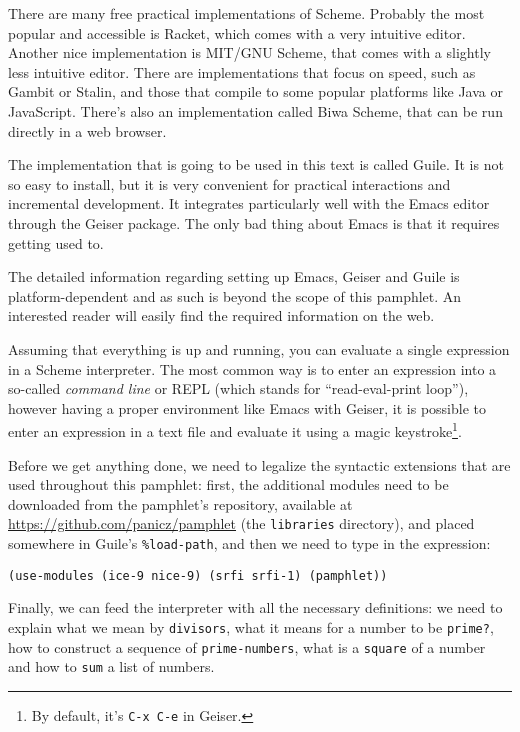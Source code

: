 There are many free practical implementations of Scheme. Probably
the most popular and accessible is Racket, which comes with
a very intuitive editor. Another nice implementation is
MIT/GNU Scheme, that comes with a slightly less intuitive editor.
There are implementations that focus on speed, such as Gambit
or Stalin, and those that compile to some popular platforms like Java
or JavaScript. There's also an implementation called Biwa Scheme,
that can be run directly in a web browser.

The implementation that is going to be used in this text is
called Guile. It is not so easy to install, but it is very
convenient for practical interactions and incremental development.
It integrates particularly well with the Emacs editor through
the Geiser package. The only bad thing about Emacs is that it requires
getting used to.

The detailed information regarding setting up Emacs, Geiser and Guile
is platform-dependent and as such is beyond the scope of this pamphlet.
An interested reader will easily find the required information on the
web.

Assuming that everything is up and running, you can evaluate
a single expression in a Scheme interpreter. The most common way
is to enter an expression into a so-called \textit{command line}
or REPL (which stands for ``read-eval-print loop''), however
having a proper environment like Emacs with Geiser, it is possible
to enter an expression in a text file and evaluate it using
a magic keystroke\footnote{By default, it's \texttt{C-x C-e}
in Geiser.}.

Before we get anything done, we need to legalize the syntactic
extensions that are used throughout this pamphlet: first, the
additional modules need to be downloaded from the pamphlet's
repository, available at \url{https://github.com/panicz/pamphlet}
(the \texttt{libraries} directory), and placed somewhere
in Guile's \texttt{\%load-path}, and then we need to type in
the expression:
\begin{Verbatim}[samepage=true]
(use-modules (ice-9 nice-9) (srfi srfi-1) (pamphlet))
\end{Verbatim}

Finally, we can feed the interpreter with all the necessary
definitions: we need to explain what we mean by \texttt{divisors},
what it means for a number to be \texttt{prime?}, how to construct
a sequence of \texttt{prime-numbers}, what is a \texttt{square}
of a number and how to \texttt{sum} a list of numbers.


